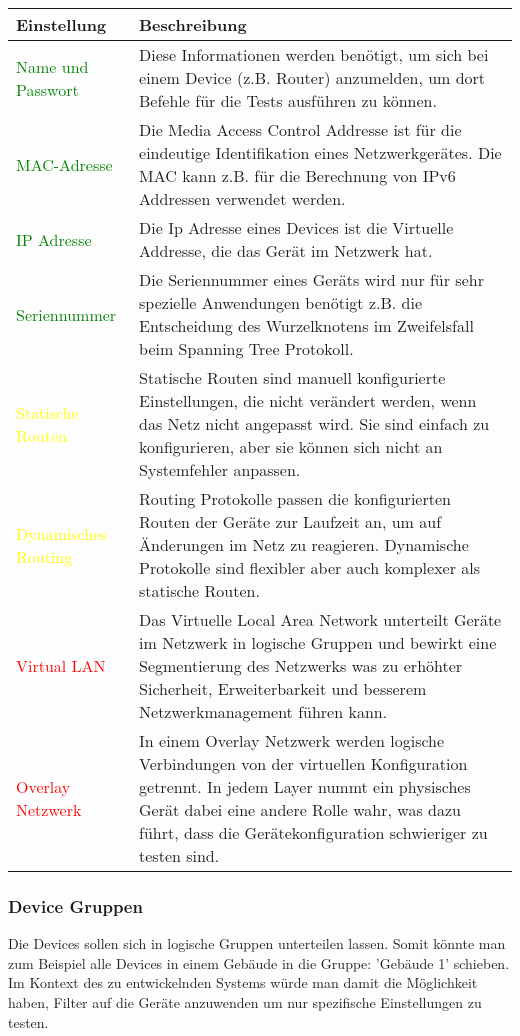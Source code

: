 \documentclass[
	ngerman,
	toc=listof, %
	toc=bibliography, %
	footnotes=multiple, %
	parskip=half, %
	numbers=noendperiod %
]{scrartcl}
\begin{document}
			\begin{tabularx}{\textwidth}{lX}
				\toprule
				Einstellung & Beschreibung\\
				\midrule
				\textcolor{green}{Name und Passwort} & Diese Informationen werden benötigt, um sich bei einem Device (z.B. Router) anzumelden, um dort Befehle für die Tests ausführen zu können. \\	
				\textcolor{green}{MAC-Adresse} & Die Media Access Control Addresse ist für die eindeutige Identifikation eines Netzwerkgerätes. Die MAC kann z.B. für die Berechnung von IPv6 Addressen verwendet werden.\\
				\textcolor{green}{IP Adresse} & Die Ip Adresse eines Devices ist die Virtuelle Addresse, die das Gerät im Netzwerk hat. \\
				\textcolor{green}{Seriennummer} & Die Seriennummer eines Geräts wird nur für sehr spezielle Anwendungen benötigt z.B. die Entscheidung des Wurzelknotens im Zweifelsfall beim Spanning Tree Protokoll. \\
				\midrule
				\textcolor{yellow}{Statische Routen} & Statische Routen sind manuell konfigurierte Einstellungen, die nicht verändert werden, wenn das Netz nicht angepasst wird. Sie sind einfach zu konfigurieren, aber sie können sich nicht an Systemfehler anpassen. \\
				\textcolor{yellow}{Dynamisches Routing} & Routing Protokolle passen die konfigurierten Routen der Geräte zur Laufzeit an, um auf Änderungen im Netz zu reagieren. Dynamische Protokolle sind flexibler aber auch komplexer als statische Routen. \\
				\midrule
				\textcolor{red}{Virtual LAN} & Das Virtuelle Local Area Network unterteilt Geräte im Netzwerk in logische Gruppen und bewirkt eine Segmentierung des Netzwerks was zu erhöhter Sicherheit, Erweiterbarkeit und besserem Netzwerkmanagement führen kann. \\
				\textcolor{red}{Overlay Netzwerk} & In einem Overlay Netzwerk werden logische Verbindungen von der virtuellen Konfiguration getrennt. In jedem Layer nummt ein physisches Gerät dabei eine andere Rolle wahr, was dazu führt, dass die Gerätekonfiguration schwieriger zu testen sind. \\				
				\bottomrule
			\end{tabularx}
			\newpage

		\subsubsection{Device Gruppen}
			Die Devices sollen sich in logische Gruppen unterteilen lassen. Somit könnte man zum Beispiel alle Devices in einem Gebäude in die Gruppe: 'Gebäude 1' schieben.
			Im Kontext des zu entwickelnden Systems würde man damit die Möglichkeit haben, Filter auf die Geräte anzuwenden um nur spezifische Einstellungen zu testen.
\end{document}
